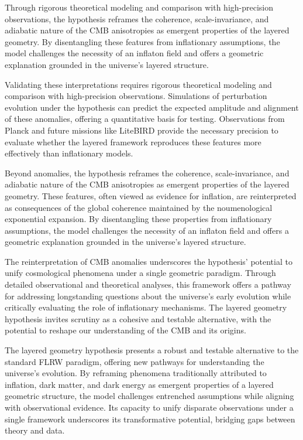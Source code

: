 \documentclass[aps,rmp,groupedaddress,twocolumn,10pt]{revtex4-2}
\begin{document}
Through rigorous theoretical modeling and comparison with high-precision observations, the hypothesis reframes the coherence, scale-invariance, and adiabatic nature of the CMB anisotropies as emergent properties of the layered geometry. By disentangling these features from inflationary assumptions, the model challenges the necessity of an inflaton field and offers a geometric explanation grounded in the universe's layered structure.

Validating these interpretations requires rigorous theoretical modeling and comparison with high-precision observations. Simulations of perturbation evolution under the hypothesis can predict the expected amplitude and alignment of these anomalies, offering a quantitative basis for testing. Observations from Planck \cite{Aghanim2020} and future missions like LiteBIRD \cite{Ghigna2024} provide the necessary precision to evaluate whether the layered framework reproduces these features more effectively than inflationary models.

Beyond anomalies, the hypothesis reframes the coherence, scale-invariance, and adiabatic nature of the CMB anisotropies as emergent properties of the layered geometry. These features, often viewed as evidence for inflation, are reinterpreted as consequences of the global coherence maintained by the noumenological exponential expansion. By disentangling these properties from inflationary assumptions, the model challenges the necessity of an inflaton field and offers a geometric explanation grounded in the universe's layered structure.

The reinterpretation of CMB anomalies underscores the hypothesis' potential to unify cosmological phenomena under a single geometric paradigm. Through detailed observational and theoretical analyses, this framework offers a pathway for addressing longstanding questions about the universe's early evolution while critically evaluating the role of inflationary mechanisms. The layered geometry hypothesis invites scrutiny as a cohesive and testable alternative, with the potential to reshape our understanding of the CMB and its origins.

The layered geometry hypothesis presents a robust and testable alternative to the standard FLRW paradigm, offering new pathways for understanding the universe's evolution. By reframing phenomena traditionally attributed to inflation, dark matter, and dark energy as emergent properties of a layered geometric structure, the model challenges entrenched assumptions while aligning with observational evidence. Its capacity to unify disparate observations under a single framework underscores its transformative potential, bridging gaps between theory and data.
\end{document}
